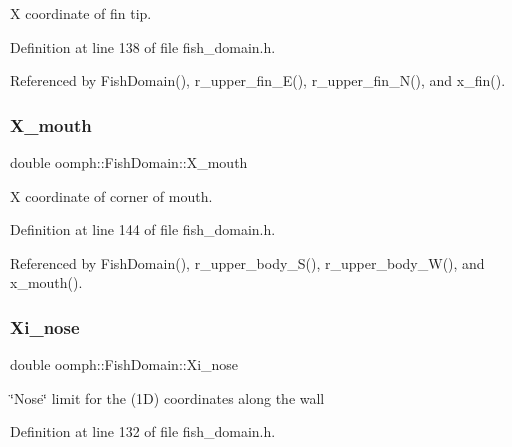 X coordinate of fin tip. 



Definition at line 138 of file fish\+\_\+domain.\+h.



Referenced by Fish\+Domain(), r\+\_\+upper\+\_\+fin\+\_\+\+E(), r\+\_\+upper\+\_\+fin\+\_\+\+N(), and x\+\_\+fin().

\mbox{\label{classoomph_1_1FishDomain_aa25f3280c2453dd725d59f23a478ee11}} 
\subsubsection{\texorpdfstring{X\+\_\+mouth}{X\_mouth}}
{\footnotesize\ttfamily double oomph\+::\+Fish\+Domain\+::\+X\+\_\+mouth\hspace{0.3cm}{\ttfamily [private]}}



X coordinate of corner of mouth. 



Definition at line 144 of file fish\+\_\+domain.\+h.



Referenced by Fish\+Domain(), r\+\_\+upper\+\_\+body\+\_\+\+S(), r\+\_\+upper\+\_\+body\+\_\+\+W(), and x\+\_\+mouth().

\mbox{\label{classoomph_1_1FishDomain_af85c4be86bb87528939778e3f63a40a5}} 
\subsubsection{\texorpdfstring{Xi\+\_\+nose}{Xi\_nose}}
{\footnotesize\ttfamily double oomph\+::\+Fish\+Domain\+::\+Xi\+\_\+nose\hspace{0.3cm}{\ttfamily [private]}}



\char`\"{}\+Nose\char`\"{} limit for the (1D) coordinates along the wall 



Definition at line 132 of file fish\+\_\+domain.\+h.



